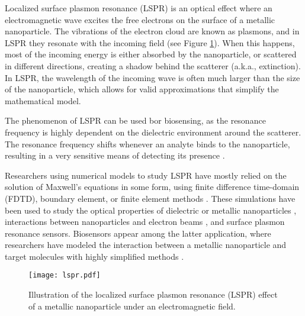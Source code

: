 
Localized surface plasmon resonance (LSPR) is an optical effect where an 
electromagnetic wave excites the free electrons on the surface of a metallic nanoparticle.
The vibrations of the electron cloud are known as plasmons, and in LSPR they resonate with the incoming
field (see Figure \ref{fig:lspr}). When this happens, most of the incoming energy
is either absorbed by the nanoparticle, or scattered in different directions,
creating a shadow behind the scatterer (a.k.a., extinction). In LSPR,
the wavelength of the incoming wave is often much larger than 
the size of the nanoparticle, 
which allows for valid approximations that simplify the mathematical model.

The phenomenon of LSPR can be used bor biosensing, 
as the resonance frequency is highly dependent on the dielectric environment 
around the scatterer. 
The resonance frequency shifts whenever an analyte binds to the nanoparticle, 
resulting in a very sensitive means of detecting its presence \cite{HaesVanduyne2002,HaesETal2004}.

Researchers using numerical models to study LSPR have mostly relied on the 
solution of Maxwell's equations in some form, using finite difference time-domain (FDTD),
boundary element, or finite element methods \cite{SolisTaboadaObelleiroLiz-MaarzanGarciadeabajo2014}. 
These simulations have been used to study the 
optical properties of dielectric or metallic nanoparticles \cite{Hohenester2018,HohenesterTrugler2012,
JungPedersenSondergaardPedersenLarsenNielsen2010, VideenSun2003,
MayergoyzFredkinZhang2005, MayergoyzZhang2007}, interactions between nanoparticles
and electron beams \cite{GarciadeabajoAizpurua1997, GarciadeabajoHowie2002},
and surface plasmon resonance sensors.
Biosensors appear among the latter application, where researchers have modeled the 
interaction between a metallic nanoparticle and target molecules with highly 
simplified methods \cite{HaesETal2004,JungCampbellChinowskyMarYee1998,DavisGomezVernon2010,AntosiewiczApellClaudioKall2011}.

\begin{figure}[h] %
   \centering
   \texttt{[image: lspr.pdf]} 
   \caption{Illustration of the localized surface plasmon resonance (LSPR) effect of a metallic nanoparticle under an electromagnetic field. }
   \label{fig:lspr}
\end{figure}

